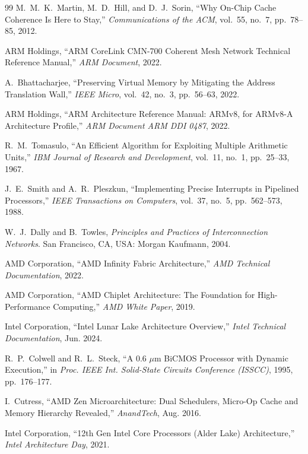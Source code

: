 \documentclass[12pt,a4paper]{IEEEtran}
\begin{document}
\begin{thebibliography}{99}
M.~M.~K.~Martin, M.~D.~Hill, and D.~J.~Sorin,
``Why On-Chip Cache Coherence Is Here to Stay,''
\textit{Communications of the ACM}, vol.~55, no.~7, pp.~78--85, 2012.

ARM Holdings,
``ARM CoreLink CMN-700 Coherent Mesh Network Technical Reference Manual,''
\textit{ARM Document}, 2022.

A.~Bhattacharjee,
``Preserving Virtual Memory by Mitigating the Address Translation Wall,''
\textit{IEEE Micro}, vol.~42, no.~3, pp.~56--63, 2022.

ARM Holdings,
``ARM Architecture Reference Manual: ARMv8, for ARMv8-A Architecture Profile,''
\textit{ARM Document ARM DDI 0487}, 2022.

R.~M.~Tomasulo,
``An Efficient Algorithm for Exploiting Multiple Arithmetic Units,''
\textit{IBM Journal of Research and Development}, vol.~11, no.~1, pp.~25--33, 1967.

J.~E.~Smith and A.~R.~Pleszkun,
``Implementing Precise Interrupts in Pipelined Processors,''
\textit{IEEE Transactions on Computers}, vol.~37, no.~5, pp.~562--573, 1988.

W.~J.~Dally and B.~Towles,
\textit{Principles and Practices of Interconnection Networks}.
San Francisco, CA, USA: Morgan Kaufmann, 2004.

AMD Corporation,
``AMD Infinity Fabric Architecture,''
\textit{AMD Technical Documentation}, 2022.

AMD Corporation,
``AMD Chiplet Architecture: The Foundation for High-Performance Computing,''
\textit{AMD White Paper}, 2019.

Intel Corporation,
``Intel Lunar Lake Architecture Overview,''
\textit{Intel Technical Documentation}, Jun. 2024.

R.~P.~Colwell and R.~L.~Steck,
``A 0.6 $\mu$m BiCMOS Processor with Dynamic Execution,''
in \textit{Proc. IEEE Int. Solid-State Circuits Conference (ISSCC)}, 1995, pp.~176--177.

I.~Cutress,
``AMD Zen Microarchitecture: Dual Schedulers, Micro-Op Cache and Memory Hierarchy Revealed,''
\textit{AnandTech}, Aug. 2016.

Intel Corporation,
``12th Gen Intel Core Processors (Alder Lake) Architecture,''
\textit{Intel Architecture Day}, 2021.


\end{thebibliography}
\end{document}
